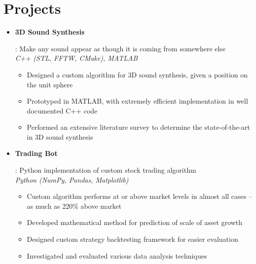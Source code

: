 \documentclass[letterpaper,11pt]{article}
\newcommand{\resumeItem}[2]{
  \item\small{
    \textbf{#1}{: #2 \vspace{-2pt}}
  }
}
\newcommand{\resumeSubItem}[2]{\resumeItem{#1}{#2}\vspace{-4pt}}
\newcommand{\resumeSubHeadingListStart}{\begin{itemize}[leftmargin=*]}
\newcommand{\resumeSubHeadingListEnd}{\end{itemize}}
\newcommand{\shorterSection}[1]{\vspace{-10pt}\section{#1}}
\begin{document}
\shorterSection{Projects}
  \resumeSubHeadingListStart
  \resumeSubItem{3D Sound Synthesis}
  {Make any sound appear as though it is coming from somewhere else \\
      \emph{C++ (STL, FFTW, CMake), MATLAB}
        \vspace{-5pt}
        \begin{itemize}
            \item Designed a custom algorithm for 3D sound synthesis, given a position on the unit sphere
            \item Prototyped in MATLAB, with extremely efficient implementation in well documented C++ code
            \item Performed an extensive literature survey to determine the state-of-the-art in 3D sound synthesis
        \end{itemize}
     }
     \resumeSubItem{Trading Bot}
     {Python implementation of custom stock trading algorithm \\
     \emph{Python (NumPy, Pandas, Matplotlib)}
        \vspace{-5pt}
        \begin{itemize}
            \item Custom algorithm performs at or above market levels in almost all cases -- as much as 220\% above market
            \item Developed mathematical method for prediction of scale of asset growth
            \item Designed custom strategy backtesting framework for easier evaluation
            \item Investigated and evaluated various data analysis techniques
        \end{itemize}
     }
  \resumeSubHeadingListEnd
\end{document}
